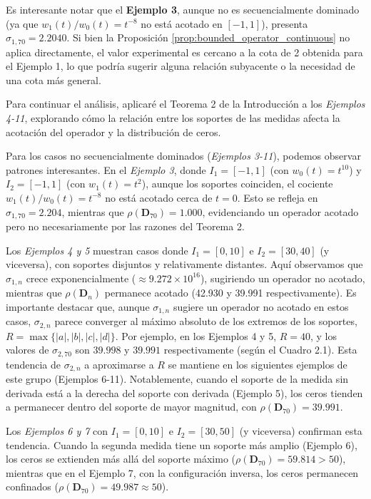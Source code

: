 \noindent Es interesante notar que el \textbf{Ejemplo 3}, aunque no es secuencialmente dominado (ya que $w_1(t)/w_0(t) = t^{-8}$ no está acotado en $[-1,1]$), presenta $\sigma_{1,70} = 2.2040$. Si bien la Proposición \ref{prop:bounded_operator_continuous} no aplica directamente, el valor experimental es cercano a la cota de 2 obtenida para el Ejemplo 1, lo que podría sugerir alguna relación subyacente o la necesidad de una cota más general.

Para continuar el análisis, aplicaré el Teorema 2 de la Introducción a los \textit{Ejemplos 4-11}, explorando cómo la relación entre los soportes de las medidas afecta la acotación del operador y la distribución de ceros.

Para los casos no secuencialmente dominados (\textit{Ejemplos 3-11}), podemos observar patrones interesantes. En el \textit{Ejemplo 3}, donde $I_1=[-1,1]$ (con $w_0(t)=t^{10}$) y $I_2=[-1,1]$ (con $w_1(t)=t^{2}$), aunque los soportes coinciden, el cociente $w_1(t)/w_0(t)=t^{-8}$ no está acotado cerca de $t=0$. Esto se refleja en $\sigma_{1,70} = 2.204$, mientras que $\rho(\mathbf{D}_{70}) = 1.000$, evidenciando un operador acotado pero no necesariamente por las razones del Teorema 2.

Los \textit{Ejemplos 4 y 5} muestran casos donde $I_1=[0,10]$ e $I_2=[30,40]$ (y viceversa), con soportes disjuntos y relativamente distantes. Aquí observamos que $\sigma_{1,n}$ crece exponencialmente ($\approx 9.272\times10^{16}$), sugiriendo un operador no acotado, mientras que $\rho(\mathbf{D}_n)$ permanece acotado (42.930 y 39.991 respectivamente). Es importante destacar que, aunque $\sigma_{1,n}$ sugiere un operador no acotado en estos casos, $\sigma_{2,n}$ parece converger al máximo absoluto de los extremos de los soportes, $R = \max\{|a|,|b|,|c|,|d|\}$. Por ejemplo, en los Ejemplos 4 y 5, $R=40$, y los valores de $\sigma_{2,70}$ son $39.998$ y $39.991$ respectivamente (según el Cuadro 2.1). Esta tendencia de $\sigma_{2,n}$ a aproximarse a $R$ se mantiene en los siguientes ejemplos de este grupo (Ejemplos 6-11). Notablemente, cuando el soporte de la medida sin derivada está a la derecha del soporte con derivada (Ejemplo 5), los ceros tienden a permanecer dentro del soporte de mayor magnitud, con $\rho(\mathbf{D}_{70}) = 39.991$.

Los \textit{Ejemplos 6 y 7} con $I_1=[0,10]$ e $I_2=[30,50]$ (y viceversa) confirman esta tendencia. Cuando la segunda medida tiene un soporte más amplio (Ejemplo 6), los ceros se extienden más allá del soporte máximo ($\rho(\mathbf{D}_{70}) = 59.814 > 50$), mientras que en el Ejemplo 7, con la configuración inversa, los ceros permanecen confinados ($\rho(\mathbf{D}_{70}) = 49.987 \approx 50$).

